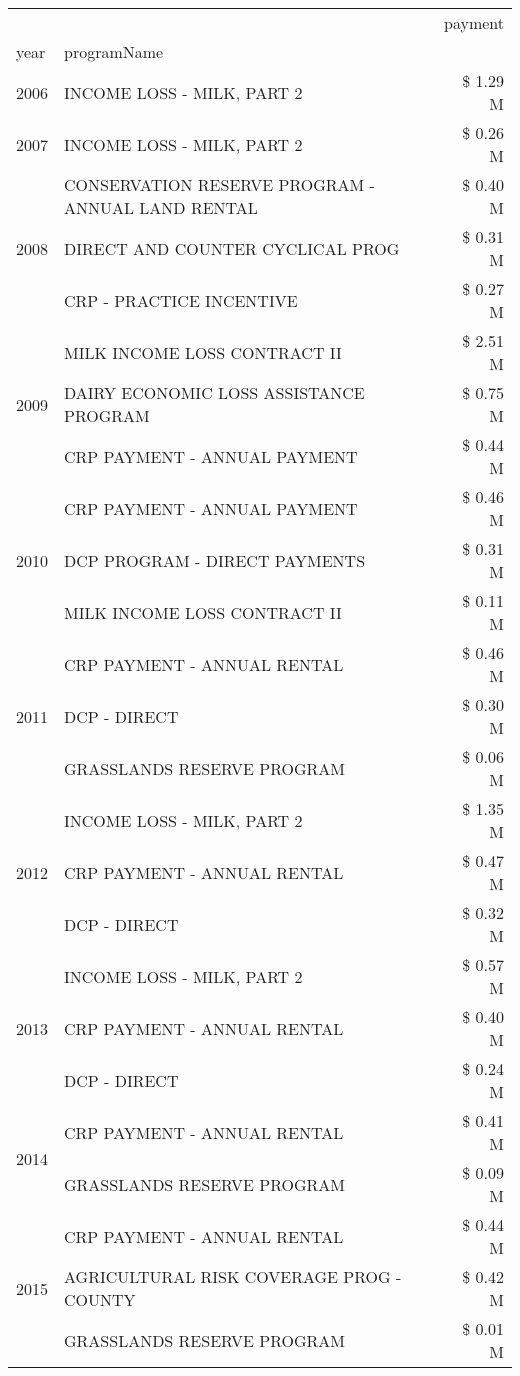 \begin{tabular}{llr}
\toprule
 &  & payment \\
year & programName &  \\
\midrule
2006 & INCOME LOSS - MILK, PART 2 & \$ 1.29 M \\
\cline{1-3}
2007 & INCOME LOSS - MILK, PART 2 & \$ 0.26 M \\
\cline{1-3}
\multirow[t]{3}{*}{2008} & CONSERVATION RESERVE PROGRAM - ANNUAL LAND RENTAL & \$ 0.40 M \\
 & DIRECT AND COUNTER CYCLICAL PROG & \$ 0.31 M \\
 & CRP - PRACTICE INCENTIVE & \$ 0.27 M \\
\cline{1-3}
\multirow[t]{3}{*}{2009} & MILK INCOME LOSS CONTRACT II & \$ 2.51 M \\
 & DAIRY ECONOMIC LOSS ASSISTANCE PROGRAM & \$ 0.75 M \\
 & CRP PAYMENT - ANNUAL PAYMENT & \$ 0.44 M \\
\cline{1-3}
\multirow[t]{3}{*}{2010} & CRP PAYMENT - ANNUAL PAYMENT & \$ 0.46 M \\
 & DCP PROGRAM - DIRECT PAYMENTS & \$ 0.31 M \\
 & MILK INCOME LOSS CONTRACT II & \$ 0.11 M \\
\cline{1-3}
\multirow[t]{3}{*}{2011} & CRP PAYMENT - ANNUAL RENTAL & \$ 0.46 M \\
 & DCP - DIRECT & \$ 0.30 M \\
 & GRASSLANDS RESERVE PROGRAM & \$ 0.06 M \\
\cline{1-3}
\multirow[t]{3}{*}{2012} & INCOME LOSS - MILK, PART 2 & \$ 1.35 M \\
 & CRP PAYMENT - ANNUAL RENTAL & \$ 0.47 M \\
 & DCP - DIRECT & \$ 0.32 M \\
\cline{1-3}
\multirow[t]{3}{*}{2013} & INCOME LOSS - MILK, PART 2 & \$ 0.57 M \\
 & CRP PAYMENT - ANNUAL RENTAL & \$ 0.40 M \\
 & DCP - DIRECT & \$ 0.24 M \\
\cline{1-3}
\multirow[t]{2}{*}{2014} & CRP PAYMENT - ANNUAL RENTAL & \$ 0.41 M \\
 & GRASSLANDS RESERVE PROGRAM & \$ 0.09 M \\
\cline{1-3}
\multirow[t]{3}{*}{2015} & CRP PAYMENT - ANNUAL RENTAL & \$ 0.44 M \\
 & AGRICULTURAL RISK COVERAGE PROG - COUNTY & \$ 0.42 M \\
 & GRASSLANDS RESERVE PROGRAM & \$ 0.01 M \\

\end{tabular}
